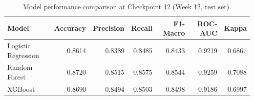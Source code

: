 \begin{table}
\caption{Model performance comparison at Checkpoint 12 (Week 12, test set).}
\label{tab:metrics}
\begin{tabular}{lrrrrrr}
\toprule
Model & Accuracy & Precision & Recall & F1-Macro & ROC-AUC & Kappa \\
\midrule
Logistic Regression & 0.8614 & 0.8389 & 0.8485 & 0.8433 & 0.9219 & 0.6867 \\
Random Forest & 0.8720 & 0.8515 & 0.8575 & 0.8544 & 0.9259 & 0.7088 \\
XGBoost & 0.8690 & 0.8494 & 0.8503 & 0.8498 & 0.9186 & 0.6997 \\
\bottomrule
\end{tabular}
\end{table}

